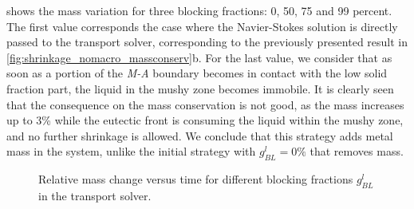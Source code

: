  shows the mass variation for three blocking fractions: 0, 50, 75 and 99 percent.
The first value corresponds the case where the Navier-Stokes solution is directly passed to the transport solver, corresponding to the previously presented result in \cref{fig:shrinkage_nomacro_massconserv}b.
For the last value, we consider that as soon as a portion of the \emph{M-A} boundary becomes
in contact with the low solid fraction part, the liquid in the mushy zone becomes immobile. 
It is clearly seen that the consequence on the mass conservation is not good, as 
the mass increases up to 3\% while the eutectic front is consuming the liquid within the mushy zone, and no further shrinkage is allowed.
We conclude that this strategy adds metal mass in the system, unlike the initial strategy with $g_{BL}^l=0\%$ that
removes mass.

\begin{figure}[htbp]
\centering
{}
\caption{Relative mass change versus time for different blocking fractions $g_{BL}^l$ in the transport solver.}
\label{fig:massconserv_blockingpct}
\end{figure}

